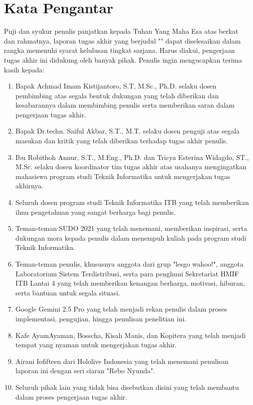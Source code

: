\chapter*{Kata Pengantar}

Puji dan syukur penulis panjatkan kepada Tuhan Yang Maha Esa atas berkat dan rahmatnya, laporan tugas akhir yang berjudul "\thetitle" dapat diselesaikan dalam rangka memenuhi syarat kelulusan tingkat sarjana. Harus diakui, pengerjaan tugas akhir ini didukung oleh banyak pihak. Penulis ingin mengucapkan terima kasih kepada:

\begin{enumerate}
  \item Bapak Achmad Imam Kistijantoro, S.T, M.Sc., Ph.D. selaku dosen pembimbing atas segala bentuk dukungan yang telah diberikan dan kesabarannya dalam membimbing penulis serta memberikan saran dalam pengerjaan tugas akhir.
  \item Bapak Dr.techn. Saiful Akbar, S.T., M.T. selaku dosen penguji atas segala masukan dan kritik yang telah diberikan terhadap tugas akhir penulis.
  \item Ibu Robithoh Annur, S.T., M.Eng., Ph.D. dan Tricya Esterina Widagdo, ST., M.Sc. selaku dosen koordinator tim tugas akhir atas usahanya mengingatkan mahasiswa program studi Teknik Informatika untuk mengerjakan tugas akhirnya.
  \item Seluruh dosen program studi Teknik Informatika ITB yang telah memberikan ilmu pengetahuan yang sangat berharga bagi penulis.
  \item Teman-teman SUDO 2021 yang telah menemani, memberikan inspirasi, serta dukungan mora kepada penulis dalam menempuh kuliah pada program studi Teknik Informatika.
  \item Teman-teman penulis, khususnya anggota dari grup "lesgo wahoo!", anggota Laboratorium Sistem Terdistribusi, serta para penghuni Sekretariat HMIF ITB Lantai 4 yang telah memberikan kenangan berharga, motivasi, hiburan, serta bantuan untuk segala situasi.
  \item Google Gemini 2.5 Pro yang telah menjadi rekan penulis dalam proses implementasi, pengujian, hingga penulisan penelitian ini.
  \item Kafe AyamAyaman, Bosscha, Kisah Manis, dan Kopitera yang telah menjadi tempat yang nyaman untuk mengerjakan tugas akhir.
  \item Airani Iofifteen dari Hololive Indonesia yang telah menemani penulisan laporan ini dengan seri siaran "Rebo Nyunda".
  \item Seluruh pihak lain yang tidak bisa disebutkan disini yang telah membantu dalam proses pengerjaan tugas akhir.
\end{enumerate}

